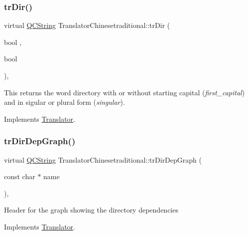\subsubsection{\texorpdfstring{trDir()}{trDir()}}
{\footnotesize\ttfamily virtual \mbox{\hyperlink{class_q_c_string}{Q\+C\+String}} Translator\+Chinesetraditional\+::tr\+Dir (\begin{DoxyParamCaption}\item[{bool}]{,  }\item[{bool}]{ }\end{DoxyParamCaption})\hspace{0.3cm}{\ttfamily [inline]}, {\ttfamily [virtual]}}

This returns the word directory with or without starting capital ({\itshape first\+\_\+capital}) and in sigular or plural form ({\itshape singular}). 

Implements \mbox{\hyperlink{class_translator}{Translator}}.

\mbox{\label{class_translator_chinesetraditional_a6a71434eafd28ebaea266715005fcf8e}} 
\subsubsection{\texorpdfstring{trDirDepGraph()}{trDirDepGraph()}}
{\footnotesize\ttfamily virtual \mbox{\hyperlink{class_q_c_string}{Q\+C\+String}} Translator\+Chinesetraditional\+::tr\+Dir\+Dep\+Graph (\begin{DoxyParamCaption}\item[{const char $\ast$}]{name }\end{DoxyParamCaption})\hspace{0.3cm}{\ttfamily [inline]}, {\ttfamily [virtual]}}

Header for the graph showing the directory dependencies 

Implements \mbox{\hyperlink{class_translator}{Translator}}.

\mbox{\label{class_translator_chinesetraditional_aee48759aa26beb5da06054ce369b664e}} 
